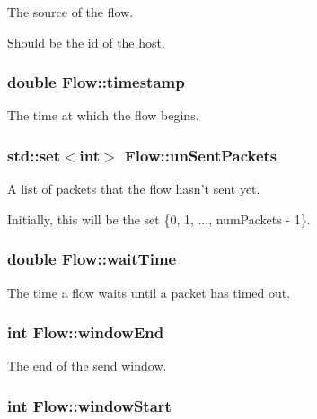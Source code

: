 \-The source of the flow. 

\-Should be the id of the host. \hypertarget{classFlow_a502b4455d485a1a0325d21d246183bb1}{
\subsubsection[{timestamp}]{\setlength{\rightskip}{0pt plus 5cm}double {\bf \-Flow\-::timestamp}}}\label{classFlow_a502b4455d485a1a0325d21d246183bb1}


\-The time at which the flow begins. 

\hypertarget{classFlow_aef2aa1abe7872f9f75f24c482c5f20f9}{
\subsubsection[{un\-Sent\-Packets}]{\setlength{\rightskip}{0pt plus 5cm}std\-::set$<$int$>$ {\bf \-Flow\-::un\-Sent\-Packets}}}\label{classFlow_aef2aa1abe7872f9f75f24c482c5f20f9}


\-A list of packets that the flow hasn't sent yet. 

\-Initially, this will be the set \{0, 1, ..., num\-Packets -\/ 1\}. \hypertarget{classFlow_a47968d3d4596ad50ce090a0c352a89f5}{
\subsubsection[{wait\-Time}]{\setlength{\rightskip}{0pt plus 5cm}double {\bf \-Flow\-::wait\-Time}}}\label{classFlow_a47968d3d4596ad50ce090a0c352a89f5}


\-The time a flow waits until a packet has timed out. 

\hypertarget{classFlow_a8ffd0d6dd0bf1c2c2b97ac164890715f}{
\subsubsection[{window\-End}]{\setlength{\rightskip}{0pt plus 5cm}int {\bf \-Flow\-::window\-End}}}\label{classFlow_a8ffd0d6dd0bf1c2c2b97ac164890715f}


\-The end of the send window. 

\hypertarget{classFlow_a1c04de60a81b02750673806906701a76}{
\subsubsection[{window\-Start}]{\setlength{\rightskip}{0pt plus 5cm}int {\bf \-Flow\-::window\-Start}}}\label{classFlow_a1c04de60a81b02750673806906701a76}


